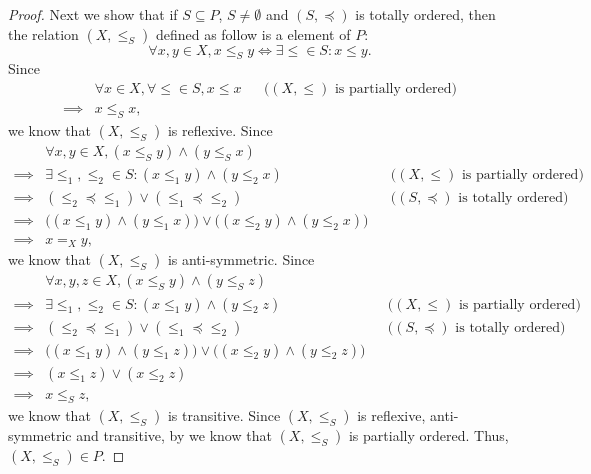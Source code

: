 \begin{proof}
  Next we show that if \(S \subseteq P\), \(S \neq \emptyset\) and \((S, \preceq)\) is totally ordered, then the relation \((X, \leq_S)\) defined as follow is a element of \(P\):
  \[
    \forall x, y \in X, x \leq_S y \iff \exists \leq \in S : x \leq y.
  \]
  Since
  \begin{align*}
             & \forall x \in X, \forall \leq \in S, x \leq x &  & \text{(\((X, \leq)\) is partially ordered)} \\
    \implies & x \leq_S x,
  \end{align*}
  we know that \((X, \leq_S)\) is reflexive.
  Since
  \begin{align*}
             & \forall x, y \in X, (x \leq_S y) \land (y \leq_S x)                                                                                        \\
    \implies & \exists \leq_1, \leq_2 \in S : (x \leq_1 y) \land (y \leq_2 x)                           &  & \text{(\((X, \leq)\) is partially ordered)}  \\
    \implies & (\leq_2 \preceq \leq_1) \lor (\leq_1 \preceq \leq_2)                                     &  & \text{(\((S, \preceq)\) is totally ordered)} \\
    \implies & \big((x \leq_1 y) \land (y \leq_1 x)\big) \lor \big((x \leq_2 y) \land (y \leq_2 x)\big)                                                   \\
    \implies & x =_X y,
  \end{align*}
  we know that \((X, \leq_S)\) is anti-symmetric.
  Since
  \begin{align*}
             & \forall x, y, z \in X, (x \leq_S y) \land (y \leq_S z)                                                                                     \\
    \implies & \exists \leq_1, \leq_2 \in S : (x \leq_1 y) \land (y \leq_2 z)                           &  & \text{(\((X, \leq)\) is partially ordered)}  \\
    \implies & (\leq_2 \preceq \leq_1) \lor (\leq_1 \preceq \leq_2)                                     &  & \text{(\((S, \preceq)\) is totally ordered)} \\
    \implies & \big((x \leq_1 y) \land (y \leq_1 z)\big) \lor \big((x \leq_2 y) \land (y \leq_2 z)\big)                                                   \\
    \implies & (x \leq_1 z) \lor (x \leq_2 z)                                                                                                             \\
    \implies & x \leq_S z,
  \end{align*}
  we know that \((X, \leq_S)\) is transitive.
  Since \((X, \leq_S)\) is reflexive, anti-symmetric and transitive, by  we know that \((X, \leq_S)\) is partially ordered.
  Thus, \((X, \leq_S) \in P\).


\end{proof}
